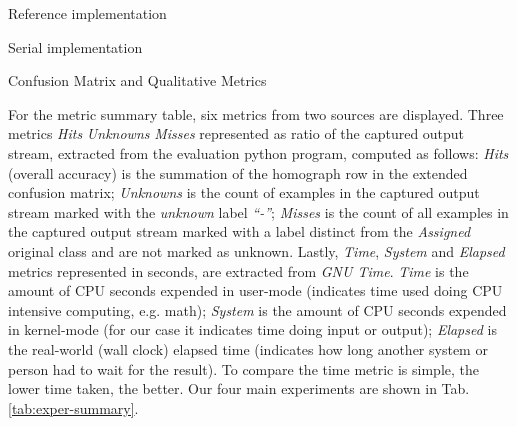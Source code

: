 %   

\begin{table}[htb]
\begin{subtable}[h]{0.9\textwidth}\begin{center}
    \caption{Reference implementation}
    
    \label{tab:java-matrix}
\end{center}\end{subtable}
\begin{subtable}[h]{0.9\textwidth}\begin{center}
    \caption{Serial implementation}
    
    \label{tab:libc-matrix}
\end{center}\end{subtable}
\caption{Confusion Matrix and Qualitative Metrics}
\label{tab:confusion-matrixes}
\end{table}

For the metric summary table, six metrics from two sources are displayed.
Three metrics \emph{Hits} \emph{Unknowns} \emph{Misses} represented as ratio of the
captured output stream, extracted from the evaluation python
program, computed as follows:
\emph{Hits} (overall accuracy) is the summation of the homograph row in the
extended confusion matrix;
\emph{Unknowns} is the count of examples in the captured output stream marked
with the \emph{unknown} label \emph{``-''};
\emph{Misses} is the count of all examples in the captured output stream marked
with a label distinct from the \emph{Assigned} original class and are not marked
as unknown.
Lastly, \emph{Time}, \emph{System} and \emph{Elapsed} metrics represented in seconds,
are extracted from \emph{GNU Time}.
\emph{Time} is the amount of CPU seconds expended in user-mode
(indicates time used doing CPU intensive computing, e.g. math);
\emph{System} is the amount of CPU seconds expended in kernel-mode
(for our case it indicates time doing input or output);
\emph{Elapsed} is the real-world (wall clock) elapsed time
(indicates how long another system or person had to wait for the result).
To compare the time metric is simple, the lower time taken, the better.
Our four main experiments are shown in Tab. \ref{tab:exper-summary}.

